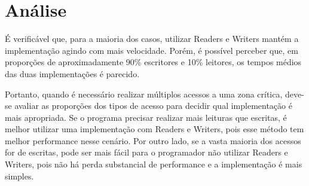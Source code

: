 \documentclass[
	12pt,				%
	oneside,			%
	a4paper,			%
	english,			%
	brazil				%
	]{abntex2ppgsi}
\begin{document}
\chapter{Análise}
É verificável que, para a maioria dos casos, utilizar Readers e Writers mantém a implementação agindo com mais velocidade. Porém, é possível perceber que, em proporções de aproximadamente 90\% escritores e 10\% leitores, os tempos médios das duas implementações é parecido.

Portanto, quando é necessário realizar múltiplos acessos a uma zona crítica, deve-se avaliar as proporções dos tipos de acesso para decidir qual implementação é mais apropriada. Se o programa precisar realizar mais leituras que escritas, é melhor utilizar uma implementação com Readers e Writers, pois esse método tem melhor performance nesse cenário. Por outro lado, se a vasta maioria dos acessos for de escritas, pode ser mais fácil para o programador não utilizar Readers e Writers, pois não há perda substancial de performance e a implementação é mais simples.

\postextual



\nocite{darkleafygreen_2011_the}
\end{document}
